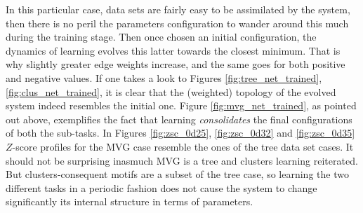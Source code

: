 \documentclass[a4paper,12pt]{article}
\begin{document}
In this particular case, data sets are fairly easy to be assimilated by the system, then there is no peril the parameters configuration to wander around this much during the training stage. Then once chosen an initial configuration, the dynamics of learning evolves this latter towards the closest minimum. That is why slightly greater edge weights increase, and the same goes for both positive and negative values. If one takes a look to Figures \ref{fig:tree_net_trained}, \ref{fig:clus_net_trained}, it is clear that the (weighted) topology of the evolved system indeed resembles the initial one. Figure \ref{fig:mvg_net_trained}, as pointed out above, exemplifies the fact that learning \textit{consolidates} the final configurations of both the sub-tasks. In Figures \ref{fig:zsc_0d25}, \ref{fig:zsc_0d32} and \ref{fig:zsc_0d35} $Z$-score profiles for the MVG case resemble the ones of the tree data set cases. It should not be surprising inasmuch MVG is a tree and clusters learning reiterated. But clusters-consequent motifs are a subset of the tree case, so learning the two different tasks in a periodic fashion does not cause the system to change significantly its internal structure in terms of parameters.
\end{document}
